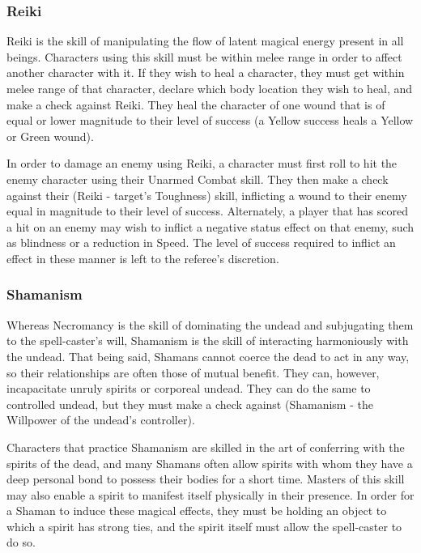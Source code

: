 \documentclass[oneside]{book}
\newcommand{\comment}[1]{}
\begin{document}
\begin{multicols}{2}
\subsubsection{Reiki}
Reiki is the skill of manipulating the flow of latent magical energy present in all beings. Characters using this skill must be within melee range in order to affect another character with it. If they wish to heal a character, they must get within melee range of that character, declare which body location they wish to heal, and make a check against Reiki. They heal the character of one wound that is of equal or lower magnitude to their level of success (a Yellow success heals a Yellow or Green wound). \comment{Alternatively, a Green or higher success can alleviate the negative effects of a Specific Wound for 1+1d4 combat turns.} 

In order to damage an enemy using Reiki, a character must first roll to hit the enemy character using their Unarmed Combat skill. They then make a check against their (Reiki - target's Toughness) skill, inflicting a wound to their enemy equal in magnitude to their level of success. Alternately, a player that has scored a hit on an enemy may wish to inflict a negative status effect on that enemy, such as blindness or a reduction in Speed. The level of success required to inflict an effect in these manner is left to the referee's discretion.

\subsubsection{Shamanism}
Whereas Necromancy is the skill of dominating the undead and subjugating them to the spell-caster's will, Shamanism is the skill of interacting harmoniously with the undead. That being said, Shamans cannot coerce the dead to act in any way, so their relationships are often those of mutual benefit. They can, however, incapacitate unruly spirits or corporeal undead. They can do the same to controlled undead, but they must make a check against (Shamanism - the Willpower of the undead's controller).

Characters that practice Shamanism are skilled in the art of conferring with the spirits of the dead, and many Shamans often allow spirits with whom they have a deep personal bond to possess their bodies for a short time. Masters of this skill may also enable a spirit to manifest itself physically in their presence. In order for a Shaman to induce these magical effects, they must be holding an object to which a spirit has strong ties, and the spirit itself must allow the spell-caster to do so. 


\end{multicols}
\end{document}
